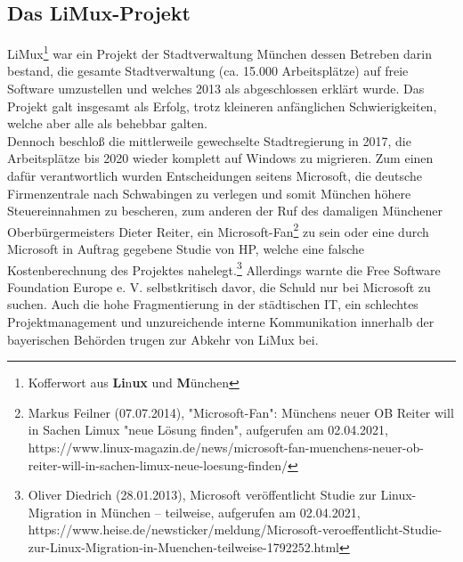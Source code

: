 \subsection{Das LiMux-Projekt}
\glqq LiMux\grqq\footnote{Kofferwort aus \textbf{Li}n\textbf{ux} und \textbf{M}ünchen} war ein Projekt der Stadtverwaltung München dessen Betreben darin bestand, die gesamte Stadtverwaltung (ca. 15.000 Arbeitsplätze) auf freie Software umzustellen und welches 2013 als abgeschlossen erklärt wurde. Das Projekt galt insgesamt als Erfolg, trotz kleineren anfänglichen Schwierigkeiten, welche aber alle als behebbar galten.\\
Dennoch beschloß die mittlerweile gewechselte Stadtregierung in 2017, die Arbeitsplätze bis 2020 wieder komplett auf Windows zu migrieren. Zum einen dafür verantwortlich wurden Entscheidungen seitens Microsoft, die deutsche Firmenzentrale nach Schwabingen zu verlegen und somit München höhere Steuereinnahmen zu bescheren, zum anderen der Ruf des damaligen Münchener Oberbürgermeisters Dieter Reiter, ein \glqq Microsoft-Fan\grqq{}\footnote{Markus Feilner (07.07.2014), "Microsoft-Fan": Münchens neuer OB Reiter will in Sachen Limux "neue Lösung finden", aufgerufen am 02.04.2021, https://www.linux-magazin.de/news/microsoft-fan-muenchens-neuer-ob-reiter-will-in-sachen-limux-neue-loesung-finden/} zu sein oder eine durch Microsoft in Auftrag gegebene Studie von HP, welche eine falsche Kostenberechnung des Projektes nahelegt.\footnote{Oliver Diedrich (28.01.2013), Microsoft veröffentlicht Studie zur Linux-Migration in München – teilweise, aufgerufen am 02.04.2021, https://www.heise.de/newsticker/meldung/Microsoft-veroeffentlicht-Studie-zur-Linux-Migration-in-Muenchen-teilweise-1792252.html} Allerdings warnte die \glqq Free Software Foundation Europe e. V.\grqq{} selbstkritisch davor, die Schuld nur bei Microsoft zu suchen. Auch die hohe Fragmentierung in der städtischen IT, ein schlechtes Projektmanagement und unzureichende interne Kommunikation innerhalb der bayerischen Behörden trugen zur Abkehr von LiMux bei.
\vfill